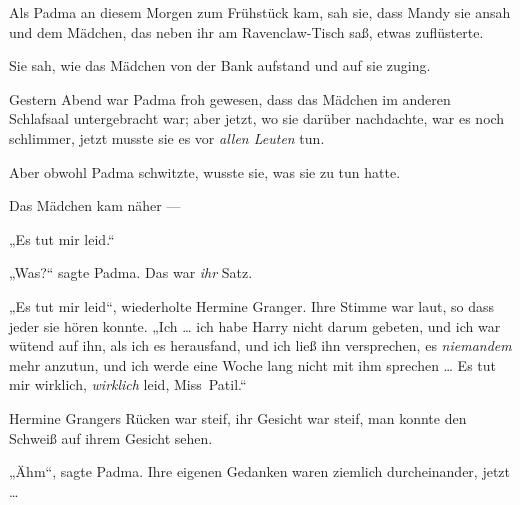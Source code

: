 \later

Als Padma an diesem Morgen zum Frühstück kam, sah sie, dass Mandy sie ansah und dem Mädchen, das neben ihr am Ravenclaw-Tisch saß, etwas zuflüsterte.

Sie sah, wie das Mädchen von der Bank aufstand und auf sie zuging.

Gestern Abend war Padma froh gewesen, dass das Mädchen im anderen Schlafsaal untergebracht war; aber jetzt, wo sie darüber nachdachte, war es noch schlimmer, jetzt musste sie es vor \emph{allen Leuten} tun.

Aber obwohl Padma schwitzte, wusste sie, was sie zu tun hatte.

Das Mädchen kam näher —

„Es tut mir leid.“

„Was?“ sagte Padma. Das war \emph{ihr} Satz.

„Es tut mir leid“, wiederholte Hermine Granger. Ihre Stimme war laut, so dass jeder sie hören konnte.
„Ich … ich habe Harry nicht darum gebeten, und ich war wütend auf ihn, als ich es herausfand, und ich ließ ihn versprechen, es \emph{niemandem} mehr anzutun, und ich werde eine Woche lang nicht mit ihm sprechen … Es tut mir wirklich, \emph{wirklich} leid, Miss~Patil.“

Hermine Grangers Rücken war steif, ihr Gesicht war steif, man konnte den Schweiß auf ihrem Gesicht sehen.

„Ähm“, sagte Padma. Ihre eigenen Gedanken waren ziemlich durcheinander, jetzt …

